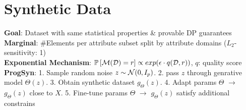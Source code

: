 \section{Synthetic Data}
\textbf{Goal}: Dataset with same statistical properties \& provable DP guarantees\\
\textbf{Marginal}: \#Elements per attribute subset split by attribute domains ($L_2$-sensitivity: 1)\\
\textbf{Exponential Mechanism}: $\mathbb{P}\left[\mathcal{M}(\mathcal{D})=r\right] \propto exp(\epsilon\cdot q(\mathcal{D},r))$, $q$: quality score\\
\textbf{ProgSyn}: 1. Sample random noise $z\sim\mathcal{N}(0,I_p)$. 2. pass $z$ through genrative model $\Theta(z)$. 3. Obtain synthetic dataset $g_{\Theta}(z)$. 4. Adapt params $\Theta$ $\rightarrow$ $g_{\Theta}(z)$ close to $X$. 5. Fine-tune params $\Theta$ $\rightarrow$ $g_{\Theta}(z)$ satisfy additional constrains
